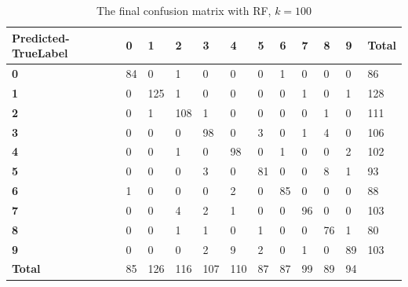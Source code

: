 \begin{table}[]
  \centering
\caption{The final confusion matrix with RF, $k = 100$}
\label{confusion_matrix_100}
\begin{tabular}{|l|l|l|l|l|l|l|l|l|l|l|l|}
\hline
\textbf{Predicted-TrueLabel} & \textbf{0} & \textbf{1} & \textbf{2} & \textbf{3} & \textbf{4} & \textbf{5} & \textbf{6} & \textbf{7} & \textbf{8} & \textbf{9} & \textbf{Total} \\ \hline
\textbf{0}                   & 84         & 0          & 1          & 0          & 0          & 0          & 1          & 0          & 0          & 0          & 86             \\ \hline
\textbf{1}                   & 0          & 125        & 1          & 0          & 0          & 0          & 0          & 1          & 0          & 1          & 128            \\ \hline
\textbf{2}                   & 0          & 1          & 108        & 1          & 0          & 0          & 0          & 0          & 1          & 0          & 111            \\ \hline
\textbf{3}                   & 0          & 0          & 0          & 98         & 0          & 3          & 0          & 1          & 4          & 0          & 106            \\ \hline
\textbf{4}                   & 0          & 0          & 1          & 0          & 98         & 0          & 1          & 0          & 0          & 2          & 102            \\ \hline
\textbf{5}                   & 0          & 0          & 0          & 3          & 0          & 81         & 0          & 0          & 8          & 1          & 93             \\ \hline
\textbf{6}                   & 1          & 0          & 0          & 0          & 2          & 0          & 85         & 0          & 0          & 0          & 88             \\ \hline
\textbf{7}                   & 0          & 0          & 4          & 2          & 1          & 0          & 0          & 96         & 0          & 0          & 103            \\ \hline
\textbf{8}                   & 0          & 0          & 1          & 1          & 0          & 1          & 0          & 0          & 76         & 1          & 80             \\ \hline
\textbf{9}                   & 0          & 0          & 0          & 2          & 9          & 2          & 0          & 1          & 0          & 89         & 103            \\ \hline
\textbf{Total}               & 85         & 126        & 116        & 107        & 110        & 87         & 87         & 99         & 89         & 94         &                \\ \hline
\end{tabular}
\end{table}

